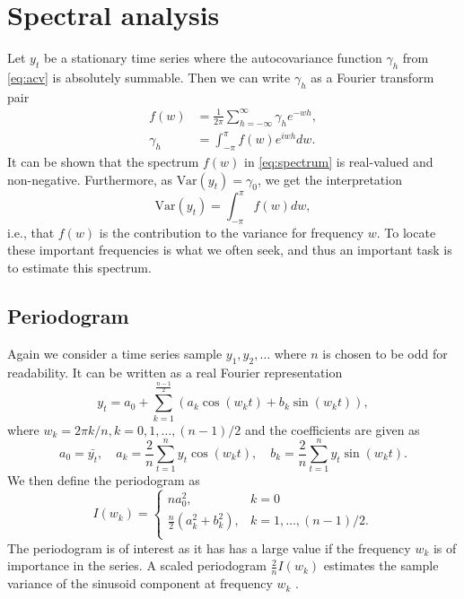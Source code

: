 \documentclass[a4paper]{memoir}
\theoremstyle{plain}
\theoremstyle{definition}
\theoremstyle{remark}
\begin{document}
\section{Spectral analysis}
Let $y_t$ be a stationary time series where the autocovariance function $\gamma_h$ from \eqref{eq:acv} is absolutely summable.
Then we can write $\gamma_h$ as a Fourier transform pair
\begin{align}\label{eq:spectrum}
        f(w) &= \frac{1}{2 \pi} \sum_{h = -\infty}^{\infty} \gamma_h e^{-wh}, \\
        \label{eq:spectral_dens_inv}
        \gamma_h &= \int_{-\pi}^{\pi} f(w)e^{iwh}dw.
\end{align}
It can be shown \cite{shumway} that the spectrum $f(w)$ in \eqref{eq:spectrum} is real-valued and non-negative.
Furthermore, as $\text{Var}(y_t) = \gamma_0$, we get the interpretation
\begin{equation*}
        \text{Var}(y_t) = \int_{-\pi}^{\pi}f(w)dw,
\end{equation*}
i.e., that $f(w)$ is the contribution to the variance for frequency $w$.
To locate these important frequencies is what we often seek, and thus an important task is to estimate this spectrum.

\subsection{Periodogram}
Again we consider a time series sample $y_1, y_2, \hdots$ where $n$ is chosen to be odd for readability.
It can be written as a real Fourier representation 
\begin{equation*}
        y_t = a_0 + \sum_{k = 1}^{\frac{n-1}{2}} (a_k \cos(w_k t) + b_k \sin (w_kt)),
\end{equation*}
where $w_k = 2\pi k / n, k =0, 1, \hdots, (n -1)/2$ and the coefficients are given as 
\begin{equation*}
        a_0 = \bar{y_t}, \quad a_k = \frac{2}{n}\sum_{t = 1}^{n}y_t \cos(w_kt), \quad b_k = \frac{2}{n} \sum_{ t = 1}^{n} y_t \sin (w_kt).
\end{equation*}
We then define the periodogram as 
\begin{equation}\label{eq:periodogram}
        I(w_k) = 
                \begin{cases}
                        na_0^2, & k=0  \\
                        \frac{n}{2}(a_k^2 + b_k^2), & k = 1, \hdots, (n-1)/2. \\
                \end{cases}
\end{equation}
The periodogram is of interest as it has has a large value if the frequency $w_k$ is of importance in the series.
A scaled periodogram $\frac{2}{n}I(w_k)$ estimates the sample variance of the sinusoid component at frequency $w_k$ \cite{shumway}.
\end{document}
